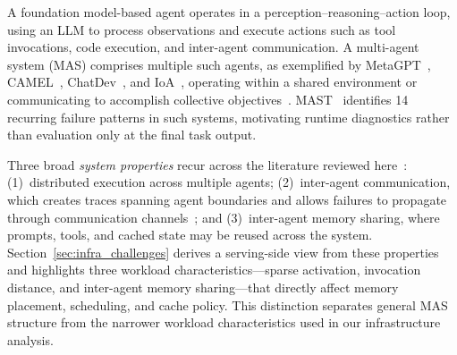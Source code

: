 A foundation model-based agent operates in a perception--reasoning--action loop, using an LLM to process observations and execute actions such as tool invocations, code execution, and inter-agent communication. A multi-agent system (MAS) comprises multiple such agents, as exemplified by MetaGPT~\citep{metagpt2024}, CAMEL~\citep{camel2023}, ChatDev~\citep{chatdev2024}, and IoA~\citep{ioa2025}, operating within a shared environment or communicating to accomplish collective objectives~\citep{li2024, wang2026classical}. MAST~\citep{mast2025} identifies 14 recurring failure patterns in such systems, motivating runtime diagnostics rather than evaluation only at the final task output.

Three broad \emph{system properties} recur across the literature reviewed here~\citep{understandingmas2026}: (1)~distributed execution across multiple agents; (2)~inter-agent communication, which creates traces spanning agent boundaries and allows failures to propagate through communication channels~\citep{famas2025, traceelephant2026}; and (3)~inter-agent memory sharing, where prompts, tools, and cached state may be reused across the system. Section~\ref{sec:infra_challenges} derives a serving-side view from these properties and highlights three workload characteristics---sparse activation, invocation distance, and inter-agent memory sharing---that directly affect memory placement, scheduling, and cache policy. This distinction separates general MAS structure from the narrower workload characteristics used in our infrastructure analysis.

